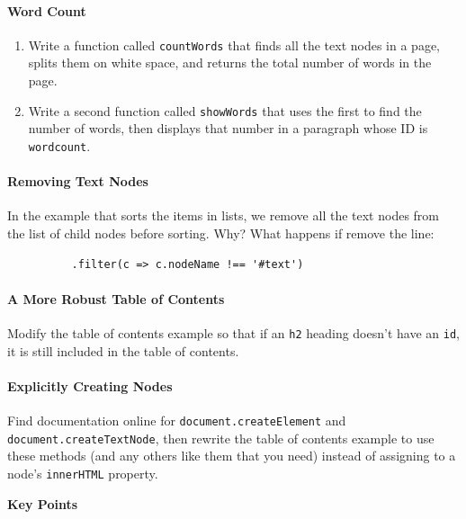 \paragraph{Word Count}\label{word-count}

\begin{enumerate}
\tightlist
\item
  Write a function called \texttt{countWords} that finds all the text
  nodes in a page, splits them on white space, and returns the total
  number of words in the page.
\item
  Write a second function called \texttt{showWords} that uses the first
  to find the number of words, then displays that number in a paragraph
  whose ID is \texttt{wordcount}.
\end{enumerate}

\paragraph{Removing Text Nodes}\label{removing-text-nodes}

In the example that sorts the items in lists, we remove all the text
nodes from the list of child nodes before sorting. Why? What happens if
remove the line:

\begin{verbatim}
          .filter(c => c.nodeName !== '#text')
\end{verbatim}

\paragraph{A More Robust Table of
Contents}\label{a-more-robust-table-of-contents}

Modify the table of contents example so that if an \texttt{h2} heading
doesn't have an \texttt{id}, it is still included in the table of
contents.

\paragraph{Explicitly Creating Nodes}\label{explicitly-creating-nodes}

Find documentation online for \texttt{document.createElement} and
\texttt{document.createTextNode}, then rewrite the table of contents
example to use these methods (and any others like them that you need)
instead of assigning to a node's \texttt{innerHTML} property.

\textbf{Key Points}

